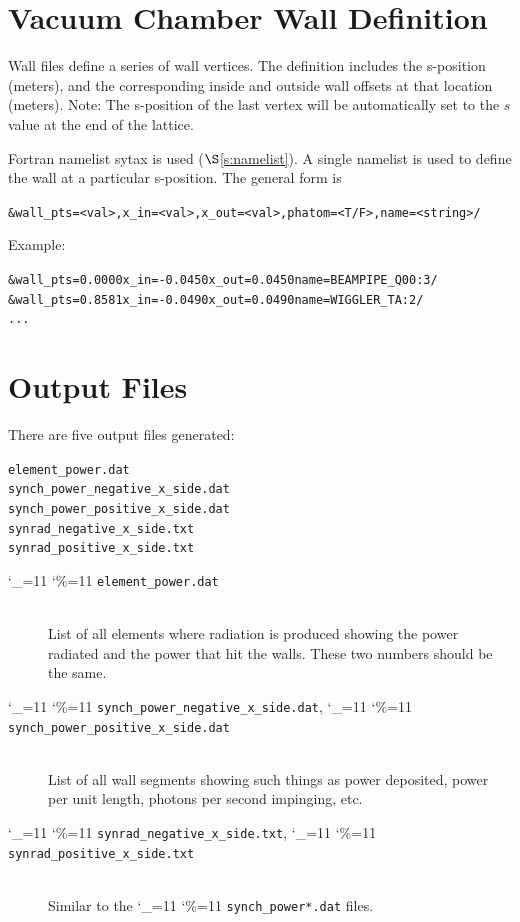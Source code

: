 \documentclass[11pt]{article}
\newcommand{\sref}[1]{$\S$\ref{#1}}
\newcommand\ttcmd{\begingroup\catcode`\_=11 \catcode`\%=11 \dottcmd}
\newcommand\dottcmd[1]{\texttt{#1}\endgroup}
\newcommand{\vn}{\ttcmd}
\newcommand{\Newline}{\hfil \\}
\newenvironment{example}
  {\vspace{-3.0ex} \begin{alltt}}
  {\end{alltt} \vspace{-2.5ex}}
\begin{document}
\section{Vacuum Chamber Wall Definition} 

Wall files define a series of wall vertices.  The definition 
includes the s-position (meters), and the corresponding 
inside and outside wall offsets at that location (meters).
Note: The s-position of the last vertex will be automatically
set to the $s$ value at the end of the lattice.

Fortran namelist sytax is used (\sref{s:namelist}).  A single namelist
is used to define the wall at a particular s-position. The general
form is
\begin{example}
  &wall_pt  s = <val>, x_in = <val>, x_out = <val>, phatom = <T/F>, name = <string> /
\end{example}
Example:
\begin{example}
  &wall_pt  s =    0.0000  x_in =  -0.0450  x_out =   0.0450  name = BEAMPIPE_Q00:3  /
  &wall_pt  s =    0.8581  x_in =  -0.0490  x_out =   0.0490  name = WIGGLER_TA:2  /
  ...
\end{example}


\section{Output Files} 

There are five output files generated:
\begin{alltt}
  element_power.dat
  synch_power_negative_x_side.dat
  synch_power_positive_x_side.dat
  synrad_negative_x_side.txt
  synrad_positive_x_side.txt
\end{alltt}

  \begin{description}
  \item[\vn{element_power.dat}] \Newline
List of all elements where radiation is produced showing the power radiated and
the power that hit the walls. These two numbers should be the same.
  \item[\vn{synch_power_negative_x_side.dat}, \vn{synch_power_positive_x_side.dat}] \Newline
List of all wall segments showing such things as power deposited, power per unit length, photons
per second impinging, etc.
  \item[\vn{synrad_negative_x_side.txt}, \vn{synrad_positive_x_side.txt}] \Newline
Similar to the \vn{synch_power*.dat} files.
  \end{description}
\end{document}
